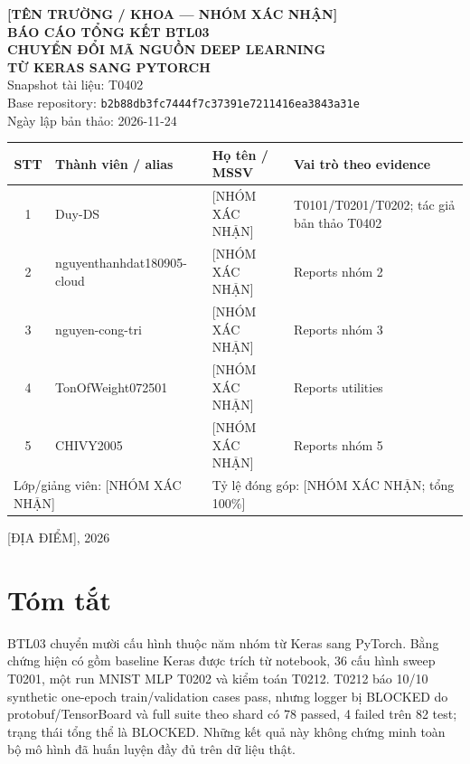 \begin{titlepage}
\thispagestyle{empty}
\begin{center}
\vspace*{1.4cm}
{\Large\bfseries [TÊN TRƯỜNG / KHOA — NHÓM XÁC NHẬN]}\\[1.5cm]
{\Large\bfseries BÁO CÁO TỔNG KẾT BTL03}\\[0.6cm]
{\LARGE\bfseries CHUYỂN ĐỔI MÃ NGUỒN DEEP LEARNING\\ TỪ KERAS SANG PYTORCH}\\[0.8cm]
Snapshot tài liệu: T0402\\
Base repository: \texttt{b2b88db3fc7444f7c37391e7211416ea3843a31e}\\
Ngày lập bản thảo: 2026-11-24
\vfill
\begin{tabularx}{\textwidth}{c p{} p{} X}
\toprule
STT & Thành viên / alias & Họ tên / MSSV & Vai trò theo evidence \\
\midrule
1 & Duy-DS & [NHÓM XÁC NHẬN] & T0101/T0201/T0202; tác giả bản thảo T0402 \\
2 & nguyenthanhdat180905-cloud & [NHÓM XÁC NHẬN] & Reports nhóm 2 \\
3 & nguyen-cong-tri & [NHÓM XÁC NHẬN] & Reports nhóm 3 \\
4 & TonOfWeight072501 & [NHÓM XÁC NHẬN] & Reports utilities \\
5 & CHIVY2005 & [NHÓM XÁC NHẬN] & Reports nhóm 5 \\
\midrule
\multicolumn{2}{l}{Lớp/giảng viên: [NHÓM XÁC NHẬN]} & \multicolumn{2}{l}{Tỷ lệ đóng góp: [NHÓM XÁC NHẬN; tổng 100\%]} \\
\bottomrule
\end{tabularx}
\vfill
[ĐỊA ĐIỂM], 2026
\end{center}
\end{titlepage}

\chapter*{Tóm tắt}
BTL03 chuyển mười cấu hình thuộc năm nhóm từ Keras sang PyTorch. Bằng chứng hiện có gồm baseline Keras được trích từ notebook, 36 cấu hình sweep T0201, một run MNIST MLP T0202 và kiểm toán T0212. T0212 báo 10/10 synthetic one-epoch train/validation cases pass, nhưng logger bị BLOCKED do protobuf/TensorBoard và full suite theo shard có 78 passed, 4 failed trên 82 test; trạng thái tổng thể là BLOCKED. Những kết quả này không chứng minh toàn bộ mô hình đã huấn luyện đầy đủ trên dữ liệu thật.

